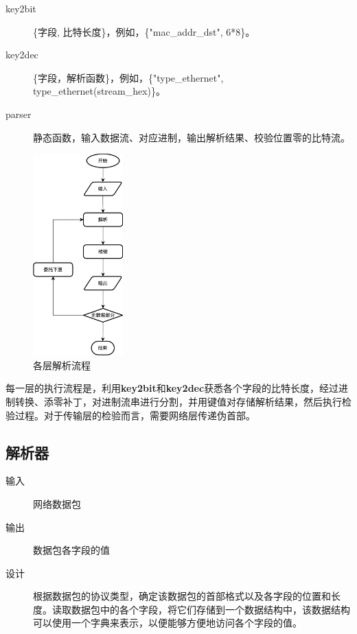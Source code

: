 \documentclass[a4paper,11pt]{article}
\begin{document}
\begin{spacing}{1.2}
\begin{CJK}{UTF8}{gbsn}
\begin{description}
	\item [key2bit] \{字段, 比特长度\}，例如，\{"mac\_addr\_dst", 6*8\}。
	\item [key2dec] \{字段，解析函数\}，例如，\{"type\_ethernet", type\_ethernet(stream\_hex)\}。
	\item [parser] 静态函数，输入数据流、对应进制，输出解析结果、校验位置零的比特流。
\end{description}


\begin{figure}[htbp]
    \centering
    \includegraphics[height=21em]{i-proc.png}
    \caption{各层解析流程}
\end{figure}

每一层的执行流程是，利用\textbf{key2bit}和\textbf{key2dec}获悉各个字段的比特长度，经过进制转换、添零补丁，对进制流串进行分割，并用键值对存储解析结果，然后执行检验过程。对于传输层的检验而言，需要网络层传递伪首部。

\newpage

\subsection{解析器}

\begin{description}
	\item [输入] 网络数据包
	\item [输出] 数据包各字段的值
	\item [设计] 根据数据包的协议类型，确定该数据包的首部格式以及各字段的位置和长度。读取数据包中的各个字段，将它们存储到一个数据结构中，该数据结构可以使用一个字典来表示，以便能够方便地访问各个字段的值。
\end{description}


\end{CJK}
\end{spacing}
\end{document}

